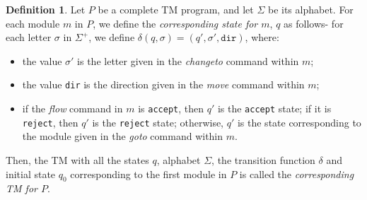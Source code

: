 \documentclass{article}
\theoremstyle{definition}
\newtheorem{definition}[theorem]{Definition}
\begin{document}
    \begin{definition}
        Let $P$ be a complete TM program, and let $\Sigma$ be its alphabet. For each module $m$ in $P$, we define the \emph{corresponding state for $m$}, $q$ as follows- for each letter $\sigma$ in $\Sigma^+$, we define $\delta(q, \sigma) = (q', \sigma', \texttt{dir})$, where:
        \begin{itemize}
            \item the value $\sigma'$ is the letter given in the \textit{changeto} command within $m$;
            \item the value \texttt{dir} is the direction given in the \textit{move} command within $m$;
            \item if the \textit{flow} command in $m$ is \texttt{accept}, then $q'$ is the \texttt{accept} state; if it is \texttt{reject}, then $q'$ is the \texttt{reject} state; otherwise, $q'$ is the state corresponding to the module given in the \textit{goto} command within $m$.
        \end{itemize}
        Then, the TM with all the states $q$, alphabet $\Sigma$, the transition function $\delta$ and initial state $q_0$ corresponding to the first module in $P$ is called the \emph{corresponding TM for $P$}.
    \end{definition}
\end{document}
